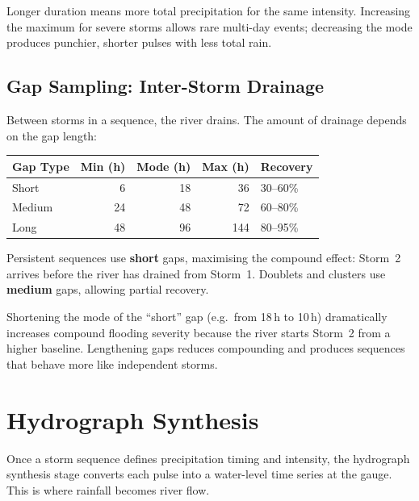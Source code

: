 \documentclass[11pt,a4paper]{article}
\begin{document}
\noindent Longer duration means more total precipitation for the same
intensity.  Increasing the maximum for severe storms allows rare
multi-day events; decreasing the mode produces punchier, shorter pulses
with less total rain.

\subsection{Gap Sampling: Inter-Storm Drainage}

Between storms in a sequence, the river drains.  The amount of drainage
depends on the gap length:

\begin{center}
\begin{tabular}{lrrrl}
\toprule
\textbf{Gap Type} & \textbf{Min (h)} & \textbf{Mode (h)} & \textbf{Max (h)} & \textbf{Recovery} \\
\midrule
Short  &  6 & 18 &  36 & 30--60\% \\
Medium & 24 & 48 &  72 & 60--80\% \\
Long   & 48 & 96 & 144 & 80--95\% \\
\bottomrule
\end{tabular}
\end{center}

\noindent Persistent sequences use \textbf{short} gaps, maximising the
compound effect: Storm~2 arrives before the river has drained from
Storm~1.  Doublets and clusters use \textbf{medium} gaps, allowing
partial recovery.

Shortening the mode of the ``short'' gap (e.g.\ from 18\,h to 10\,h)
dramatically increases compound flooding severity because the river
starts Storm~2 from a higher baseline.  Lengthening gaps reduces
compounding and produces sequences that behave more like independent
storms.


\section{Hydrograph Synthesis}
\label{ch:hydro}

Once a storm sequence defines precipitation timing and intensity, the
hydrograph synthesis stage converts each pulse into a water-level time
series at the gauge.  This is where rainfall becomes river flow.
\end{document}
